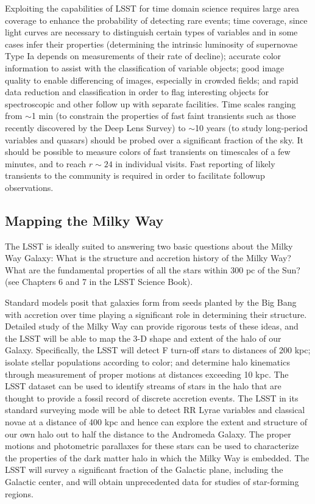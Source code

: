 Exploiting the capabilities of LSST for time domain science requires large
area coverage to enhance the probability of detecting rare events; time
coverage, since light curves are necessary to distinguish certain types of
variables and in some cases infer their properties (\eg determining the
intrinsic luminosity of supernovae Type Ia depends on measurements of their
rate of decline); accurate color information to assist with the
classification of variable objects; good image quality to enable
differencing of images, especially in crowded fields; and rapid data
reduction and classification in order to flag interesting objects for
spectroscopic and other follow up with separate facilities. Time scales
ranging from $\sim$1 min (to constrain the properties of fast faint
transients such as those recently discovered by the Deep Lens Survey) to
$\sim$10 years (to study long-period variables and quasars) should be
probed over a significant fraction of the sky. It should be possible to
measure colors of fast transients on timescales of a few minutes,
and to reach $r \sim 24$ in individual visits. Fast reporting of likely transients
to the community is required in order to facilitate followup observations.



\subsection{Mapping the Milky Way \label{sec:MW}}


The LSST is ideally suited to answering two basic questions about the Milky
Way Galaxy: What is the structure and accretion history of the Milky Way?
What are the fundamental properties of all the stars within 300 pc of the
Sun? (see Chapters 6 and 7 in the LSST Science Book).

Standard models posit that galaxies form from seeds planted by the Big Bang
with accretion over time playing a significant role in determining their
structure.  Detailed study of the Milky Way can provide rigorous tests of
these ideas, and the LSST will be able to map the 3-D shape and extent of
the halo of our Galaxy.  Specifically, the LSST will detect F turn-off
stars to distances of 200 kpc; isolate stellar populations according to
color; and determine halo kinematics through measurement of proper motions
at distances exceeding 10 kpc. The LSST dataset can be used to identify
streams of stars in the halo that are thought to provide a fossil record of
discrete accretion events. The LSST in its standard surveying mode will be
able to detect RR Lyrae variables and classical novae at a distance of 400
kpc and hence can explore the extent and structure of our own halo out to
half the distance to the Andromeda Galaxy. The proper motions and
photometric parallaxes for these stars can be used to characterize the
properties of the dark matter halo in which the Milky Way is embedded.
The LSST will survey a significant fraction of the Galactic plane,
including the Galactic center, and will obtain unprecedented data for
studies of star-forming regions.

